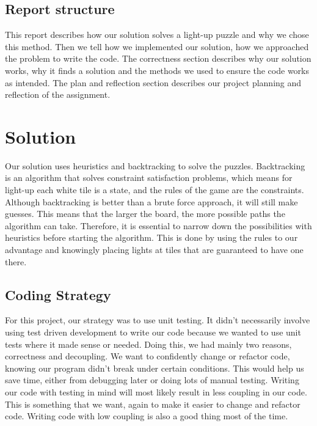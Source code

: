 \documentclass[12pt]{article}
\begin{document}
\subsection{Report structure} 
This report describes how our solution solves a light-up puzzle and why we chose this method. Then we tell how we implemented our solution, how we approached the problem to write the code. The correctness section describes why our solution works, why it finds a solution and the methods we used to ensure the code works as intended. The plan and reflection section describes our project planning and reflection of the assignment.



\section{Solution}
Our solution uses heuristics and backtracking to solve the puzzles. Backtracking is an algorithm that solves constraint satisfaction problems, which means for light-up each white tile is a state, and the rules of the game are the constraints. Although backtracking is better than a brute force approach, it will still make guesses. This means that the larger the board, the more possible paths the algorithm can take. Therefore, it is essential to narrow down the possibilities with heuristics before starting the algorithm. This is done by using the rules to our advantage and knowingly placing lights at tiles that are guaranteed to have one there.


\subsection{Coding Strategy}
\label{coding strat}


For this project, our strategy was to use unit testing. It didn't necessarily involve using test driven development to write our code because we wanted to use unit tests where it made sense or needed. Doing this, we had mainly two reasons, correctness and decoupling. We want to confidently change or refactor code, knowing our program didn't break under certain conditions. This would help us save time, either from debugging later or doing lots of manual testing. Writing our code with testing in mind will most likely result in less coupling in our code. This is something that we want, again to make it easier to change and refactor code. Writing code with low coupling is also a good thing most of the time.
\end{document}
